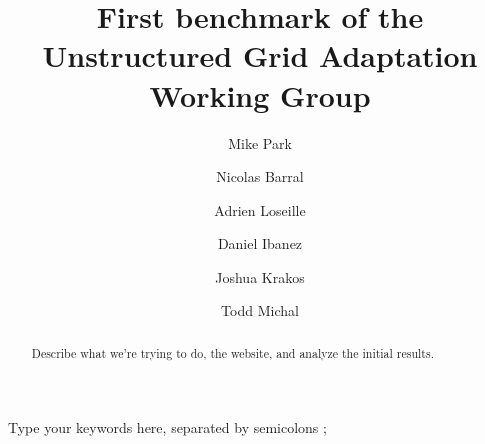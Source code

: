 \documentclass[3p,times,procedia,number]{elsarticle}
\begin{document}
\begin{frontmatter}




\title{First benchmark of the Unstructured Grid Adaptation Working Group}




\author[a]{Mike Park}
\author[e]{Nicolas Barral}
\author[b]{Adrien Loseille}
\author[c]{Daniel Ibanez}
\author[d]{Joshua Krakos}
\author[d]{Todd Michal}

\address[a]{NASA Langley Research Center, Mail Stop 128, Hampton, VA 23681, United States}
\address[b]{INRIA}
\address[c]{Sandia National Laboratories, P.O. Box 5800, Albuquerque, NM 87185-1321, United States}
\address[d]{Boeing}
\address[e]{Department of Earth Science and Engineering, Imperial College London}

\begin{abstract}
Describe what we're trying to do, the website, and analyze the initial results.
\end{abstract}

\begin{keyword}
Type your keywords here, separated by semicolons ;




\end{keyword}
\end{frontmatter}
\end{document}
